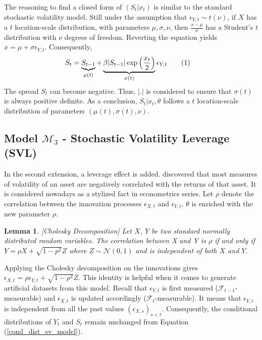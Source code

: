 \documentclass[11pt,a4,twosided,singlespacing,titlepagenumber=on]{scrreprt}
\numberwithin{equation}{chapter} %
\newtheorem{lemma}[theorem]{Lemma}%
\theoremstyle{remark}
\newcommand\numberthis{\addtocounter{equation}{1}\tag{\theequation}}
\begin{document}
The reasoning to find a closed form of $(S_t | x_t)$ is similar to the standard stochastic volatility model. Still under the assumption that $\epsilon_{Y,t} \sim t(\nu)$, if $X$ has a $t$ location-scale distribution, with parameters $\mu, \sigma, \nu$, then $\frac{x-\mu}{\sigma}$ has a Student's $t$ distribution with $\nu$ degrees of freedom. Reverting the equation yields $x = \mu + \sigma \epsilon_{Y,t}$. Consequently,
\begin{align*}
S_t  &= \underbrace{S_{t-1}}_{\mu(t)} + \underbrace{\beta |S_{t-1}| \exp \left( \frac{x_t}{2} \right)}_{\sigma(t)} \epsilon_{Y,t} \numberthis
\end{align*}
The spread $S_t$ can become negative. Thus, $|.|$ is considered to ensure that $\sigma(t)$ is always positive definite. As a conclusion, $S_t | x_t, \theta$ follows a $t$ location-scale distribution of parameters $(\mu(t), \sigma(t), \nu)$. 

\subsection{Model $\mathcal{M}_3$ - Stochastic Volatility Leverage (SVL)}
In the second extension, a leverage effect is added. \cite{black1976} discovered that most measures of volatility of an asset are negatively correlated with the returns of that asset. It is considered nowadays as a stylized fact in econometrics series. Let $\rho$ denote the correlation between the innovation processes $\epsilon_{X,t}$ and $\epsilon_{Y,t}$. $\theta$ is enriched with the new parameter $\rho$.

\begin{lemma}
\textit{
[Cholesky Decomposition] Let $X$, $Y$ be two standard normally distributed random variables. The correlation between X and Y is $\rho$ if and only if $Y = \rho X + \sqrt{1-p^2} Z$ where $Z \sim \mathcal{N}(0,1)$ and is independent of both $X$ and $Y$.
}
\end{lemma}
Applying the Cholesky decomposition on the innovations gives $\epsilon_{X,t} = \rho \epsilon_{Y,t} + \sqrt{1-\rho^2} Z$. This identity is helpful when it comes to generate artificial datasets from this model. Recall that $\epsilon_{Y,t}$ is first measured ($\mathcal{F}_{t-1}$-measurable) and $\epsilon_{X,t}$ is updated accordingly ($\mathcal{F}_t$-measurable). It means that $\epsilon_{Y,t}$ is independent from all the past values $(\epsilon_{X,s})_{s < t}$. Consequently, the conditional distributions of $Y_t$ and $S_t$ remain unchanged from Equation (\ref{cond_dist_sv_model}).
\end{document}
